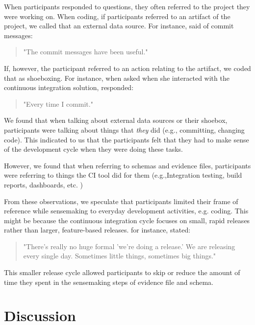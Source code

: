 \documentclass{sig-alternate}
\begin{document}
When participants responded to questions, they often referred to the project they were working on. When coding, if participants referred to an artifact of the project, we called that an external data source. For instance, \srutitwo  said of commit messages: 

\begin{quote}
"The commit messages have been  useful."
\end{quote}


If, however, the participant referred to an action relating to the artifact, we coded that as shoeboxing. For instance, when asked when she interacted with the continuous integration solution, \srutitwo responded: 

\begin{quote}
"Every time I commit."	
\end{quote}


We found that when talking about external data sources  or their shoebox, participants were talking about things that \textit{they} did (e.g., committing, changing code). This indicated to us that the participants felt that they had to make sense of the development cycle when they were doing these tasks. 

However, we found that when referring to schemas and evidence files, participants were referring to things the CI tool did for them (e.g.,Integration testing, build reports, dashboards, etc.
) 

From these observations, we speculate that participants limited their frame of reference while sensemaking to everyday development activities, e.g. coding. This might be because the continuous integration cycle focuses on small, rapid releases rather than larger, feature-based releases. for instance, \cpg stated:

\begin{quote}
"There's really no huge formal 'we're doing a release.' We are releasing every single day. Sometimes little things, sometimes big things."	
\end{quote}


This smaller release cycle allowed participants to skip or reduce the amount of time they spent in the sensemaking steps of evidence file and schema. 

\section{Discussion}
\end{document}

